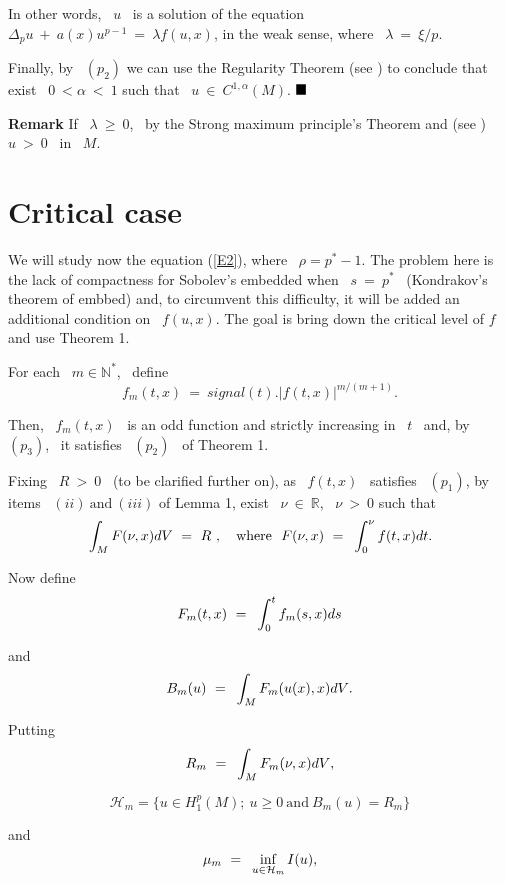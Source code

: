 \documentclass[12pt]{article}
\begin{document}
In other words, \ $u$ \ is a solution of the equation $\Delta_p u \ + \ a(x)u^{p -1} \ = \ \lambda f(u,x)$,
in the weak sense, where \ $\lambda \ = \ \xi/p$. 

Finally, by \ $(p_2)$  we can use the Regularity Theorem (see  \cite{druet4})
 to conclude that exist \ $0 \ < \alpha \ < \ 1$ such that \ $u \ \in \ C^{1,\alpha}(M)$. {$\hfill{\rule{2.5mm}{2.5mm}}$}

{\bf Remark}
If \ $\lambda \ \geq \ 0$, \ by the Strong maximum principle's Theorem and (see \cite{druet4}) \ $u \ > \ 0$ \ in \ $M$.

\section{Critical case}
\mbox{}

We will study now the equation  (\ref{E2}), where  \ $ \rho  =  p^{\ast}  -  1$.  The problem here is the lack of compactness for
Sobolev's embedded  when \ $s \ = \ p^{\ast}$ \ (Kondrakov's theorem of embbed) and, to circumvent this difficulty,
it will be added an additional condition on \ $f(u,x)$. The goal is bring down the critical level of   $f $ and use Theorem 1. 


For each \ $ m \in \mathbb{N}^{\ast}$, \ define
\vspace{-0.5mm}
$$f_m(t,x) \ = \ signal(t).|f(t,x)|^{m/(m+1)}.$$

\noindent  Then, \ $f_m(t,x)$ \ is an odd function and strictly increasing in \ $t$ \ and, by \ $(p_3)$, 
\ it satisfies \ $(p_2)$ \ of Theorem 1.

Fixing \ $R \ > \ 0$ \ (to be clarified further on), as \ $f(t,x)$ \ satisfies \ $(p_1)$, by items
 \ $(ii) \ \mbox{and} \ (iii)$ of Lemma 1, exist \ $\nu \ \in \ \mathbb{R}$, \ $\nu \ > \ 0$ such that
$${\displaystyle}\int_M{F(\nu,x)dV} \ = \ R \ , \ \ \ \mbox{where} \ \ F(\nu,x) \ = \ {\displaystyle}\int_0^{\nu}{f(t,x)dt}.$$

Now define
$$F_m(t,x) \ = \ {\displaystyle}\int^{t}_0{f_m(s,x)ds}$$

\noindent and
$$B_m(u) \ = \ {\displaystyle}\int_M{F_m(u(x),x)dV}.$$

Putting
$$R_m \ = \ {\displaystyle}\int_M{F_m(\nu,x)dV},$$

$$\mathcal{H}_m  = \{u \in H^p_1(M); \ u \geq 0 \ \mbox{and} \ B_m(u) = R_m \}$$

\noindent  and
$$\mu_m \ = \ {\displaystyle}\inf_{u \in \mathcal{H}_m}{I(u)},$$
\end{document}
